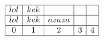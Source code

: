 \documentclass[12pt]{article}
\begin{document}
$
\begin{array}{|c|c|c|c|c|}
\hline
lol & kek &  &  & \\
\hline
lol & kek & azaza &  & \\
\hline
0 & 1 & 2 & 3 & 4\\
\hline
\end{array}
$
\end{document}
